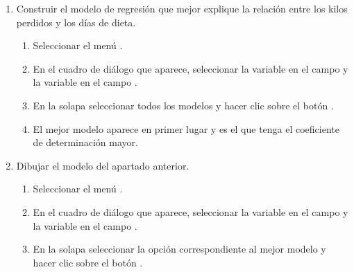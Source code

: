 \begin{enumerate}[leftmargin=*]
\begin{enumerate}
\item Construir el modelo de regresión que mejor explique la relación entre los kilos perdidos y los días de dieta.
\begin{indicacion}
\begin{enumerate}
\item Seleccionar el menú .
\item En el cuadro de diálogo que aparece, seleccionar la variable  en el campo  y la variable  en el campo .
\item En la solapa  seleccionar todos los modelos y hacer clic sobre el botón .
\item El mejor modelo aparece en primer lugar y es el que tenga el coeficiente de determinación mayor.
\end{enumerate}
\end{indicacion}

\item Dibujar el modelo del apartado anterior.
\begin{indicacion}
\begin{enumerate}
\item Seleccionar el menú .
\item En el cuadro de diálogo que aparece, seleccionar la variable  en el campo 
y la variable  en el campo .
\item En la solapa  seleccionar la opción correspondiente al mejor modelo y hacer
clic sobre el botón .
\end{enumerate}
\end{indicacion}


\end{enumerate}
\end{enumerate}
